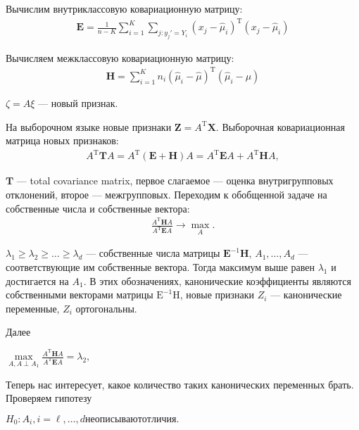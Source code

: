 \documentclass[12pt]{article}
\begin{document}
	Вычислим внутриклассовую ковариационную матрицу:
	\begin{eqnarray}\label{CDA_1} 
	\textbf{E}=\frac{1}{n-K}\sum_{i=1}^{K}\sum_{j:y_{j}\prime=Y_{i}}(x_{j}-\hat{\mu}_{i})^{\mathrm{T}}(x_{j}-\hat{\mu}_{i})
	\end{eqnarray}
	
	Вычисляем межклассовую ковариационную матрицу:
	\begin{eqnarray}\label{CDA_2}
	\textbf{H}=\sum_{i=1}^{K}n_{i}(\hat{\mu}_{i}-\hat{\mu})^{\mathrm{T}}(\hat{\mu}_{i}-\mu)
	\end{eqnarray}

	$\zeta=A\xi$ --- новый признак. 
	
	На выборочном языке новые признаки $\textbf{Z}=A^{\mathrm{T}}\textbf{X}$. Выборочная ковариационная матрица новых признаков:
	\begin{eqnarray}\label{CDA_3}
		A^{\mathrm{T}}\textbf{T}A=A^{\mathrm{T}}(\textbf{E}+\textbf{H})A=A^{\mathrm{T}}\textbf{E}A+A^{\mathrm{T}}\textbf{H}A,
	\end{eqnarray}

	$\textbf{T}$ --- total covariance matrix, первое слагаемое --- оценка внутригрупповых отклонений, второе --- межгрупповых. Переходим к обобщенной
	задаче на собственные числа и собственные вектора:
	\begin{eqnarray}\label{CDA_3}
		\frac{A^{\mathrm{T}}\textbf{H}A}{A^{\mathrm{T}}\textbf{E}A}\rightarrow\max_{A}.
	\end{eqnarray}
	
	$\lambda_{1}\geq\lambda_{2}\geq\ldots\geq\lambda_{d}$ --- собственные числа матрицы $\textbf{E}^{-1} \textbf{H}$, $A_1, \dots, A_d$ --- соответствующие
	им собственные вектора. Тогда максимум выше равен $\lambda_{1}$ и достигается на $A_1$. В этих обозначениях, канонические коэффициенты являются собственными векторами матрицы $\mathrm{E}^{-1}\mathrm{H}$, новые признаки $Z_i$ --- канонические переменные, $Z_i$ ортогональны. 
	

	Далее	
	\begin{center}
	$\underset{A,A\perp A_{1}} \max \frac{A^{\mathrm{T}}\textbf{H}A}{A^{\mathrm{T}}\textbf{E}A}=\lambda_{2},$
	\end{center}
	
	Теперь нас интересует, какое количество таких канонических переменных брать. Проверяем гипотезу
	
	\begin{center}
		$H_0 : A_i, i = \ell, \dots, d не описывают отличия.$
	\end{center}
\end{document}
